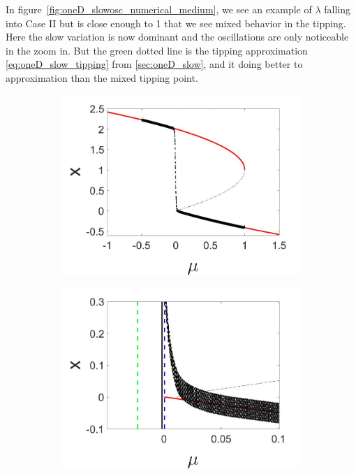 In figure~\ref{fig:oneD_slowosc_numerical_medium}, we see an example of $\lambda$ falling into Case II but is close enough to 1 that we see mixed behavior in the tipping. Here the slow variation is now dominant and the oscillations are only noticeable in the zoom in. But the green dotted line is the tipping approximation \eqref{eq:oneD_slow_tipping} from \autoref{sec:oneD_slow}, and it doing better to approximation than the mixed tipping point.

\begin{figure}[H]
\centering
\begin{subfigure}{.5\textwidth}
 \centering
 \includegraphics[width=\linewidth]{oneD/slowosc_bif_diagram_medium.jpg}
 \caption{}
\end{subfigure}%
\begin{subfigure}{.5\textwidth}
 \centering
 \includegraphics[width=\linewidth]{oneD/slowosc_bif_diagram_medium_zoom.jpg}

\end{subfigure}
\end{figure}
